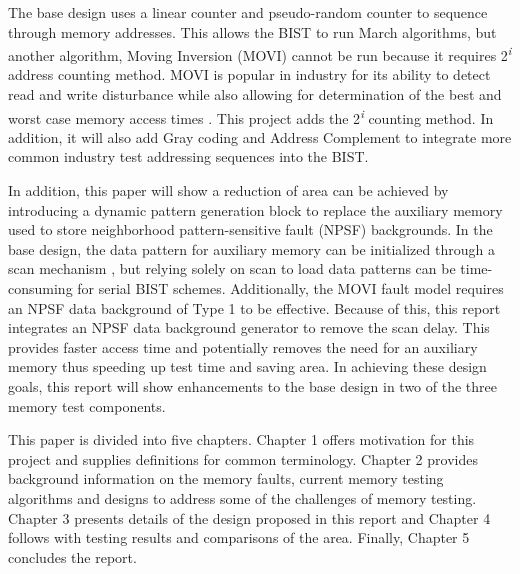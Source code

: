 The base design uses a linear counter and pseudo-random counter to sequence through memory addresses.  This allows the BIST to run March algorithms, but another algorithm, Moving Inversion (MOVI) cannot be run because it requires 2\textsuperscript{\textit{i}} address counting method.   MOVI is popular in industry for its ability to detect read and write disturbance while also allowing for determination of the best and worst case memory access times \cite{VanDeGoor1991}.  This project adds the 2\textsuperscript{\textit{i}} counting method.  In addition, it will also add Gray coding and Address Complement to integrate more common industry test addressing sequences into the BIST. 

In addition, this paper will show a reduction of area can be achieved by introducing a dynamic pattern generation block to replace the auxiliary memory used to store neighborhood pattern-sensitive fault (NPSF) backgrounds.  In the base design, the data pattern for auxiliary memory can be initialized through a scan mechanism \cite{748806}, but relying solely on scan to load data patterns can be time-consuming for serial BIST schemes.  Additionally, the MOVI fault model requires an NPSF data background of Type 1 to be effective.  Because of this, this report integrates an NPSF data background generator to remove the scan delay.  This provides faster access time and potentially removes the need for an auxiliary memory thus speeding up test time and saving area.  In achieving these design goals, this report will show enhancements to the base design in two of the three memory test components.

This paper is divided into five chapters.
Chapter 1 offers motivation for this project and supplies definitions for common terminology.  Chapter 2 provides background information on the memory faults, current memory testing algorithms and designs to address some of the challenges of memory testing.  Chapter 3 presents details of the design proposed in this report and Chapter 4 follows with testing results and comparisons of the area.
Finally, Chapter 5 concludes the report.  




